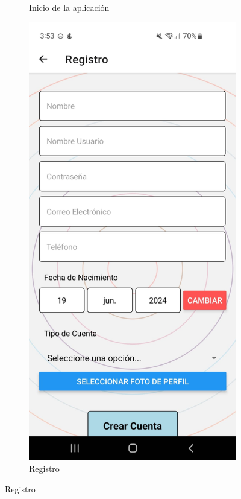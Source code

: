 \begin{figure}[H]
\begin{subfigure}{0.45\textwidth}
        \caption{Inicio de la aplicación}
        \label{fig:img5}
    \end{subfigure}%
    \hfill
    \begin{subfigure}{0.45\textwidth}
        \centering
        \includegraphics[width=\linewidth]{imagenes/Capturas/Registro.jpeg}
        \caption{Registro}
        \label{fig:img6}
    \end{subfigure}
\end{figure}
\vspace*{\fill}

